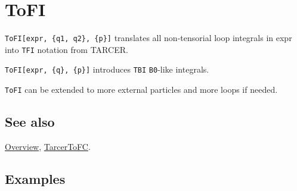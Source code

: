 \documentclass[../FeynCalcManual.tex]{subfiles}
\begin{document}
\hypertarget{tofi}{%
\section{ToFI}\label{tofi}}

\texttt{ToFI[\allowbreak{}expr,\ \allowbreak{}\{\allowbreak{}q1,\ \allowbreak{}q2\},\ \allowbreak{}\{\allowbreak{}p\}]}
translates all non-tensorial loop integrals in expr into \texttt{TFI}
notation from TARCER.

\texttt{ToFI[\allowbreak{}expr,\ \allowbreak{}\{\allowbreak{}q\},\ \allowbreak{}\{\allowbreak{}p\}]}
introduces \texttt{TBI} \texttt{B0}-like integrals.

\texttt{ToFI} can be extended to more external particles and more loops
if needed.

\subsection{See also}

\hyperlink{toc}{Overview}, \hyperlink{tarcertofc}{TarcerToFC}.

\subsection{Examples}
\end{document}
